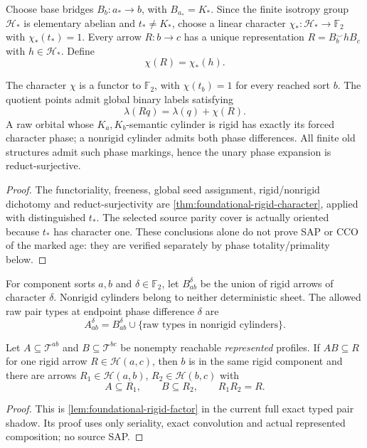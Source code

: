 Choose base bridges $B_b:a_*\to b$, with
$B_{a_*}=K_*$. Since the finite isotropy group
$\mathcal H_*$ is elementary abelian and
$t_*\ne K_*$, choose a linear character
$\chi_*:\mathcal H_*\to\mathbb F_2$ with
$\chi_*(t_*)=1$. Every arrow $R:b\to c$ has a
unique representation $R=B_b^\smile hB_c$ with
$h\in\mathcal H_*$. Define
\[
 \chi(R)=\chi_*(h).
 \tag{6}\label{eq:groupoid-character}
\]

\begin{proposition}
\label{prop:groupoid-phase}
The character $\chi$ is a functor to $\mathbb F_2$,
with $\chi(t_b)=1$ for every reached sort $b$.
The quotient points admit global binary labels
satisfying
\[
 \lambda(Rq)=\lambda(q)+\chi(R).
 \tag{7}\label{eq:quotient-phase}
\]
A raw orbital whose $K_a,K_b$-semantic cylinder is
rigid has exactly its forced character phase; a
nonrigid cylinder admits both phase differences.
All finite old structures admit such phase
markings, hence the unary phase expansion is
reduct-surjective.
\end{proposition}
\begin{proof}
The functoriality, freeness, global seed assignment,
rigid/nonrigid dichotomy and reduct-surjectivity
are \cref{thm:foundational-rigid-character},
applied with distinguished $t_*$.
The selected source parity cover is actually
oriented because $t_*$ has character one.
These conclusions alone do not prove SAP or CCO
of the marked age: they are verified separately
by phase totality/primality below.
\end{proof}

For component sorts $a,b$ and
$\delta\in\mathbb F_2$, let $B_{ab}^{\delta}$
be the union of rigid arrows of character
$\delta$. Nonrigid cylinders belong to neither
deterministic sheet. The allowed raw pair
types at endpoint phase difference $\delta$ are
\[
 A_{ab}^{\delta}
  = B_{ab}^{\delta}\cup
    \{\text{raw types in nonrigid cylinders}\}.
\]

\begin{lemma}
\label{lem:rigid-product-factorisation}
Let $A\subseteq\mathcal T^{ab}$ and
$B\subseteq\mathcal T^{bc}$ be nonempty
reachable \emph{represented} profiles.
If $AB\subseteq R$ for one rigid arrow
$R\in\mathcal H(a,c)$, then $b$ is in the
same rigid component and there are arrows
$R_1\in\mathcal H(a,b)$,
$R_2\in\mathcal H(b,c)$ with
\[
 A\subseteq R_1,\qquad B\subseteq R_2,
                  \qquad R_1R_2=R.
\]
\end{lemma}
\begin{proof}
This is \cref{lem:foundational-rigid-factor}
in the current full exact typed pair shadow.
Its proof uses only seriality, exact convolution
and actual represented composition; no source SAP.
\end{proof}


